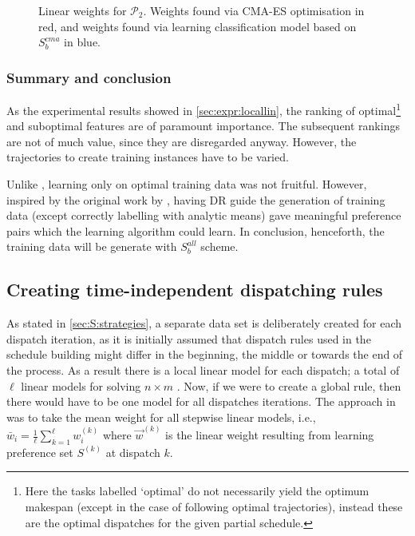 \begin{figure}
\caption{Linear weights for $\mathcal{P_2}$. Weights found via CMA-ES optimisation in red, and weights found via learning classification model based on $S_b^{cma}$ in blue.}\label{fig:weights:p2}
\end{figure}


\subsubsection{Summary and conclusion }
As the experimental results showed in \cref{sec:expr:locallin}, the ranking of optimal\footnote{Here the tasks labelled `optimal' do not necessarily yield the optimum makespan (except in the case of following optimal trajectories), instead these are the optimal dispatches for the given partial schedule.} and suboptimal features are of paramount importance. The subsequent rankings are not of much value, since they are disregarded anyway. However, the trajectories to create training instances have to be varied.

Unlike \citep{Siggi10,Malik08,Russell09}, learning only on optimal training data was not fruitful. However, inspired by the original work by \cite{Siggi05}, having DR guide the generation of training data (except correctly labelling with analytic means) gave meaningful preference pairs which the learning algorithm could learn. In conclusion, henceforth, the training data will be generate with $S_{b}^{all}$ scheme.

\subsection{Creating time-independent dispatching rules}
As stated in \cref{sec:S:strategies}, a separate data set is deliberately created for each dispatch iteration, as it is initially assumed that dispatch rules used in the schedule building might differ in the beginning, the middle or towards the end of the process. As a result there is a local linear model for each dispatch; a total of $\ell$ linear models for solving $n\times m$ \jsp. Now, if we were to create a global rule, then there would have to be one model for all dispatches iterations. The approach in \cite{InRu11a} was to take the mean weight for all stepwise linear models, i.e., $\bar{w}_i=\frac{1}{\ell}\sum_{k=1}^{\ell}w_i^{(k)}$ where $\vec{w}^{(k)}$ is the linear weight resulting from learning preference set $S^{(k)}$ at dispatch $k$. 

